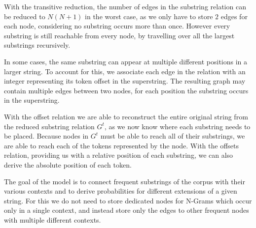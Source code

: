 With the transitive reduction, the number of edges in the substring relation can be reduced to $N(N + 1)$ in the worst case, as we only have to store $2$ edges for each node, considering no substring occurs more than once. However every substring is still reachable from every node, by travelling over all the largest substrings recursively.

In some cases, the same substring can appear at multiple different positions in a larger string. To account for this, we associate each edge in the relation with an integer representing its token offset in the superstring. The resulting graph may contain multiple edges between two nodes, for each position the substring occurs in the superstring.

With the offset relation we are able to reconstruct the entire original string from the reduced substring relation $G^t$, as we now know where each substring needs to be placed. Because nodes in $G^t$ must be able to reach all of their substrings, we are able to reach each of the tokens represented by the node. With the offsets relation, providing us with a relative position of each substring, we can also derive the absolute position of each token.

The goal of the model is to connect frequent substrings of the corpus with their various contexts and to derive probabilities for different extensions of a given string. For this we do not need to store dedicated nodes for N-Grams which occur only in a single context, and instead store only the edges to other frequent nodes with multiple different contexts.


